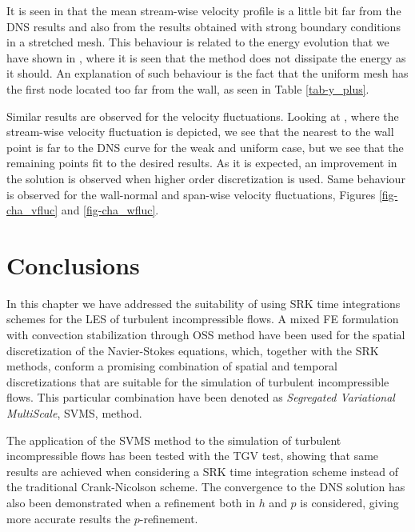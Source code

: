It is seen in  that the mean stream-wise velocity profile is a little bit far from the DNS results and also from the results obtained with strong boundary conditions in a stretched mesh. This behaviour is related to the energy evolution that we have shown in , where it is seen that the method does not dissipate the energy as it should. An explanation of such behaviour is the fact that the uniform mesh has the first node located too far from the wall, as seen in Table \ref{tab-y_plus}. 

%
Similar results are observed for the velocity fluctuations. Looking at , where the stream-wise velocity fluctuation is depicted, we see that the nearest to the wall point is far to the DNS curve for the weak and uniform case, but we see that the remaining points fit to the desired results. As it is expected, an improvement in the solution is observed when higher order discretization is used. Same behaviour is observed for the wall-normal and span-wise velocity fluctuations, Figures \ref{fig-cha_vfluc} and \ref{fig-cha_wfluc}.

\section{Conclusions}
\label{sec-C7_conclusions}
In this chapter we have addressed the suitability of using SRK time integrations schemes for the LES of turbulent incompressible flows. A mixed FE formulation with convection stabilization through OSS method have been used for the spatial discretization of the Navier-Stokes equations, which, together with the SRK methods, conform a promising combination of spatial and temporal discretizations that are suitable for the simulation of turbulent incompressible flows. This particular combination have been denoted as \textit{Segregated Variational MultiScale}, SVMS, method.

The application of the SVMS method to the simulation of turbulent incompressible flows has been tested with the TGV test, showing that same results are achieved when considering a SRK time integration scheme instead of the traditional Crank-Nicolson scheme. The convergence to the DNS solution has also been demonstrated when a refinement both in $ h $ and $ p $ is considered, giving more accurate results the $ p $-refinement.

